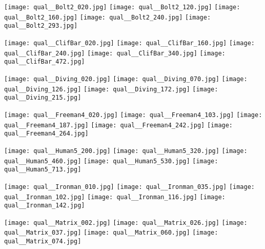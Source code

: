 \documentclass[10pt,twocolumn,letterpaper]{article}
\begin{document}
\begin{figure*}
\begin{center}
\texttt{[image: qual\_\_Bolt2\_020.jpg]}
\texttt{[image: qual\_\_Bolt2\_120.jpg]}
\texttt{[image: qual\_\_Bolt2\_160.jpg]}
\texttt{[image: qual\_\_Bolt2\_240.jpg]}
\texttt{[image: qual\_\_Bolt2\_293.jpg]}

\texttt{[image: qual\_\_ClifBar\_020.jpg]}
\texttt{[image: qual\_\_ClifBar\_160.jpg]}
\texttt{[image: qual\_\_ClifBar\_240.jpg]}
\texttt{[image: qual\_\_ClifBar\_340.jpg]}
\texttt{[image: qual\_\_ClifBar\_472.jpg]}

\texttt{[image: qual\_\_Diving\_020.jpg]}
\texttt{[image: qual\_\_Diving\_070.jpg]}
\texttt{[image: qual\_\_Diving\_126.jpg]}
\texttt{[image: qual\_\_Diving\_172.jpg]}
\texttt{[image: qual\_\_Diving\_215.jpg]}

\texttt{[image: qual\_\_Freeman4\_020.jpg]}
\texttt{[image: qual\_\_Freeman4\_103.jpg]}
\texttt{[image: qual\_\_Freeman4\_187.jpg]}
\texttt{[image: qual\_\_Freeman4\_242.jpg]}
\texttt{[image: qual\_\_Freeman4\_264.jpg]}

\texttt{[image: qual\_\_Human5\_200.jpg]}
\texttt{[image: qual\_\_Human5\_320.jpg]}
\texttt{[image: qual\_\_Human5\_460.jpg]}
\texttt{[image: qual\_\_Human5\_530.jpg]}
\texttt{[image: qual\_\_Human5\_713.jpg]}

\texttt{[image: qual\_\_Ironman\_010.jpg]}
\texttt{[image: qual\_\_Ironman\_035.jpg]}
\texttt{[image: qual\_\_Ironman\_102.jpg]}
\texttt{[image: qual\_\_Ironman\_116.jpg]}
\texttt{[image: qual\_\_Ironman\_142.jpg]}

\texttt{[image: qual\_\_Matrix\_002.jpg]}
\texttt{[image: qual\_\_Matrix\_026.jpg]}
\texttt{[image: qual\_\_Matrix\_037.jpg]}
\texttt{[image: qual\_\_Matrix\_060.jpg]}
\texttt{[image: qual\_\_Matrix\_074.jpg]}


\end{center}
\end{figure*}
\end{document}
